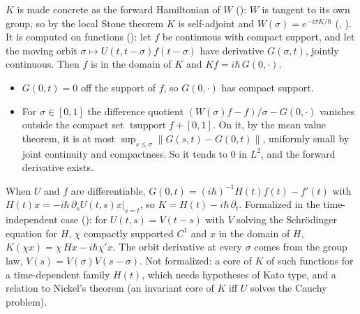 \documentclass[11pt]{article}
\begin{document}
$K$ is made concrete as the forward Hamiltonian of $W$ ():
$W$ is tangent to its own group, so by the local Stone theorem $K$ is self-adjoint and
$W(\sigma) = e^{-i\sigma K/\hbar}$ (,
). It is computed on functions
(): let $f$ be continuous with compact support, and let the moving
orbit $\sigma \mapsto U(t,t-\sigma)f(t-\sigma)$ have derivative $G(\sigma,t)$, jointly continuous.
Then $f$ is in the domain of $K$ and $Kf = i\hbar\,G(0,\cdot)$.
\begin{itemize}
\item $G(0,t) = 0$ off the support of $f$, so $G(0,\cdot)$ has compact support.
\item For $\sigma \in [0,1]$ the difference quotient $(W(\sigma)f - f)/\sigma - G(0,\cdot)$
  vanishes outside the compact set $\operatorname{tsupport} f + [0,1]$. On it, by the mean value
  theorem, it is at most $\sup_{s \le \sigma}\|G(s,t) - G(0,t)\|$, uniformly small by joint
  continuity and compactness. So it tends to $0$ in $L^2$, and the forward derivative exists.
\end{itemize}
When $U$ and $f$ are differentiable, $G(0,t) = (i\hbar)^{-1}H(t)f(t) - f'(t)$ with
$H(t)x = -i\hbar\,\partial_s U(t,s)x|_{s=t}$, so $K = H(t) - i\hbar\,\partial_t$. Formalized in
the time-independent case (): for $U(t,s) = V(t-s)$ with
$V$ solving the Schr\"odinger equation for $H$, $\chi$ compactly supported $C^1$ and $x$ in the
domain of $H$, $K(\chi x) = \chi\,Hx - i\hbar\chi' x$. The orbit derivative at every $\sigma$
comes from the group law, $V(s) = V(\sigma)V(s-\sigma)$. Not formalized: a core of $K$ of such
functions for a time-dependent family $H(t)$, which needs hypotheses of Kato type, and a
relation to Nickel's theorem (an invariant core of $K$ iff $U$ solves the Cauchy problem).
\end{document}
